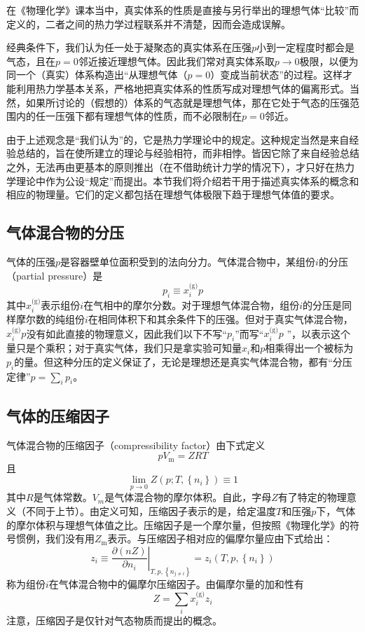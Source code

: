 \documentclass[main.tex]{subfiles}
\begin{document}
在《物理化学》课本当中，真实体系的性质是直接与另行举出的理想气体“比较”而定义的，二者之间的热力学过程联系并不清楚，因而会造成误解。

经典条件下，我们认为任一处于凝聚态的真实体系在压强$p$小到一定程度时都会是气态，且在$p=0$邻近接近理想气体。因此我们常对真实体系取$p\rightarrow 0$极限，以便为同一个（真实）体系构造出“从理想气体（$p=0$）变成当前状态”的过程。这样才能利用热力学基本关系，严格地把真实体系的性质写成对理想气体的偏离形式。当然，如果所讨论的（假想的）体系的气态就是理想气体，那在它处于气态的压强范围内的任一压强下都有理想气体的性质，而不必限制在$p=0$邻近。

由于上述观念是“我们认为”的，它是热力学理论中的规定。这种规定当然是来自经验总结的，旨在使所建立的理论与经验相符，而非相悖。皆因它除了来自经验总结之外，无法再由更基本的原则推出（在不借助统计力学的情况下），才只好在热力学理论中作为公设“规定”而提出。本节我们将介绍若干用于描述真实体系的概念和相应的物理量。它们的定义都包括在理想气体极限下趋于理想气体值的要求。

\subsection{气体混合物的分压}
气体的压强$p$是容器壁单位面积受到的法向分力。气体混合物中，某组份$i$的分压（partial pressure）是
\[p_i\equiv x_i^\text{(g)}p\]
其中$x_i^\text{(g)}$表示组份$i$在气相中的摩尔分数。对于理想气体混合物，组份$i$的分压是同样摩尔数的纯组份$i$在相同体积下和其余条件下的压强。但对于真实气体混合物，$x_i^\text{(g)}p$没有如此直接的物理意义，因此我们以下不写“$p_i$”而写“$x_i^\text{(g)}p$
”，以表示这个量只是个乘积；对于真实气体，我们只是拿实验可知量$x_i$和$p$相乘得出一个被标为$p_i$的量。但这种分压的定义保证了，无论是理想还是真实气体混合物，都有“分压定律”$p=\sum_i p_i$。

\subsection{气体的压缩因子}
气体混合物的压缩因子（compressibility factor）由下式定义
\[pV_\text{m}=ZRT\]
且
\[\lim_{p\to 0}Z\left(p;T,\left\{n_i\right\}\right)\equiv 1\]
其中$R$是气体常数。$V_m$是气体混合物的摩尔体积。自此，字母$Z$有了特定的物理意义（不同于上节）。由定义可知，压缩因子表示的是，给定温度$T$和压强$p$下，气体的摩尔体积与理想气体值之比。压缩因子是一个摩尔量，但按照《物理化学》的符号惯例，我们没有用$Z_\text{m}$表示。与压缩因子相对应的偏摩尔量应由下式给出：
\[z_i\equiv\left.\frac{\partial\left(n Z\right)}{\partial n_i}\right|_{T,p,\left\{n_{j\neq i}\right\}}=z_i\left(T,p,\left\{n_i\right\}\right)\]
称为组份$i$在气体混合物中的偏摩尔压缩因子。由偏摩尔量的加和性有
\[Z=\sum_i x_i^\text{(g)}z_i\]
注意，压缩因子是仅针对气态物质而提出的概念。
\end{document}
